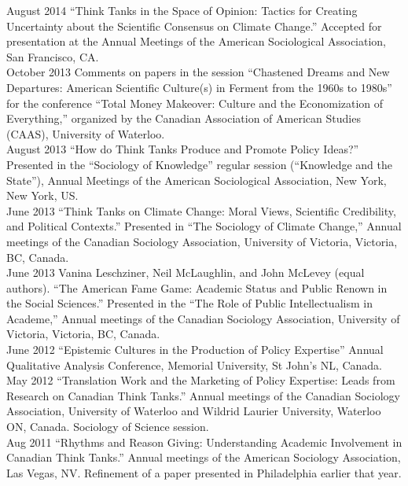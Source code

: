 \documentclass[9pt,usenames,dvipsnames]{article}
\begin{document}
\ind August 2014 ``Think Tanks in the Space of Opinion: Tactics for Creating Uncertainty about the Scientific Consensus on Climate Change.'' Accepted for presentation at the Annual Meetings of the American Sociological Association, San Francisco, CA. \\

\ind October 2013 Comments on papers in the session ``Chastened Dreams and New Departures: American Scientific Culture(s) in Ferment from the 1960s to 1980s'' for the conference ``Total Money Makeover: Culture and the Economization of Everything,'' organized by the Canadian Association of American Studies (CAAS), University of Waterloo. \\

\ind August 2013 ``How do Think Tanks Produce and Promote Policy Ideas?'' Presented in the ``Sociology of Knowledge'' regular session (``Knowledge and the State''), Annual Meetings of the American Sociological Association, New York, New York, US. \\

\ind June 2013 ``Think Tanks on Climate Change: Moral Views, Scientific Credibility, and Political Contexts.'' Presented in ``The Sociology of Climate Change,'' Annual meetings of the Canadian Sociology Association, University of Victoria, Victoria, BC, Canada. \\

\ind June 2013 Vanina Leschziner, Neil McLaughlin, and John McLevey (equal authors). ``The American Fame Game: Academic Status and Public Renown in the Social Sciences.'' Presented in the ``The Role of Public Intellectualism in Academe,'' Annual meetings of the Canadian Sociology Association, University of Victoria, Victoria, BC, Canada. \\

\ind June 2012 ``Epistemic Cultures in the Production of Policy Expertise'' Annual Qualitative Analysis Conference, Memorial University, St John's NL, Canada.\\

\ind May 2012 ``Translation Work and the Marketing of Policy Expertise: Leads from Research on Canadian Think Tanks.'' Annual meetings of the Canadian Sociology Association, University of Waterloo and Wildrid Laurier University, Waterloo ON, Canada. Sociology of Science session.\\

\ind Aug 2011 ``Rhythms and Reason Giving: Understanding Academic Involvement in Canadian Think Tanks.'' Annual meetings of the American Sociology Association, Las Vegas, NV. Refinement of a paper presented in Philadelphia earlier that year. \\
\end{document}
